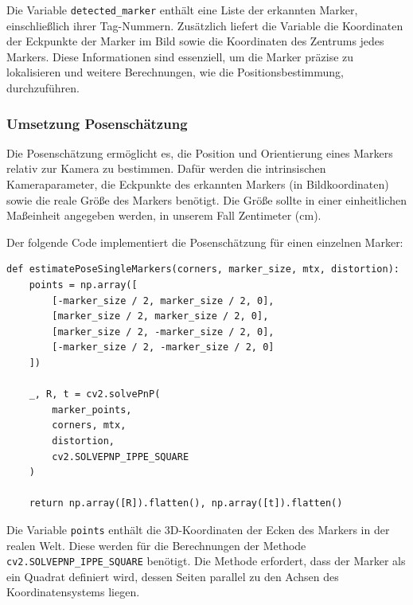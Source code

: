 Die Variable \texttt{detected\_marker} enthält eine Liste der erkannten Marker, einschließlich ihrer Tag-Nummern.
Zusätzlich liefert die Variable die Koordinaten der Eckpunkte der Marker im Bild sowie 
die Koordinaten des Zentrums jedes Markers. Diese Informationen sind essenziell, um die Marker 
präzise zu lokalisieren und weitere Berechnungen, wie die Positionsbestimmung, durchzuführen.



\subsubsection{Umsetzung Posenschätzung}
Die Posenschätzung ermöglicht es, die Position und Orientierung eines Markers relativ zur Kamera
zu bestimmen. Dafür werden die intrinsischen Kameraparameter, die Eckpunkte des erkannten 
Markers (in Bildkoordinaten) sowie die reale Größe des Markers benötigt. Die Größe sollte 
in einer einheitlichen Maßeinheit angegeben werden, in unserem Fall Zentimeter (cm). \clearpage

Der folgende Code implementiert die Posenschätzung für einen einzelnen Marker:



\begin{lstlisting}
def estimatePoseSingleMarkers(corners, marker_size, mtx, distortion):
    points = np.array([
        [-marker_size / 2, marker_size / 2, 0],
        [marker_size / 2, marker_size / 2, 0],
        [marker_size / 2, -marker_size / 2, 0],
        [-marker_size / 2, -marker_size / 2, 0]
    ])

    _, R, t = cv2.solvePnP(
        marker_points, 
        corners, mtx, 
        distortion,
        cv2.SOLVEPNP_IPPE_SQUARE
    )
    
    return np.array([R]).flatten(), np.array([t]).flatten()
\end{lstlisting}

Die Variable \texttt{points} enthält die 3D-Koordinaten der Ecken des Markers in der realen Welt. 
Diese werden für die Berechnungen der Methode  \texttt{cv2.SOLVEPNP\_IPPE\_SQUARE} benötigt. 
Die Methode erfordert, dass der Marker als ein Quadrat definiert wird, dessen Seiten parallel 
zu den Achsen des Koordinatensystems liegen.

